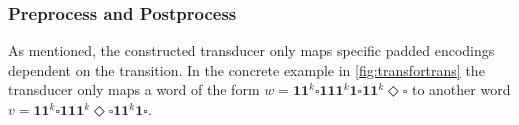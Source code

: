 %
%
%
%
%


\subsubsection{Preprocess and Postprocess}

As mentioned, the constructed transducer only maps specific padded encodings dependent on the transition. In the concrete example in \autoref{fig:transfortrans} the transducer only maps a word of the form $w = \bm{11}^{k}\square\bm{111}^{k}\bm{1}\square\bm{11}^{k}\Diamond\square$ to another word $v = \bm{11}^{k}\square\bm{111}^{k}\Diamond\square\bm{11}^{k}\bm{1}\square$.

